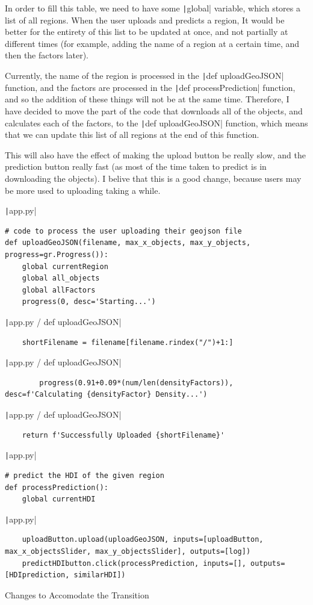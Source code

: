 \documentclass[12pt]{report}
\newcommand{\pil}[1]{\protect\texttt|#1|}
\begin{document}
In order to fill this table, we need to have some \pil{global} variable, which stores a list of all regions. When the user uploads and predicts a region, It would be better for the entirety of this list to be updated at once, and not partially at different times (for example, adding the name of a region at a certain time, and then the factors later).

Currently, the name of the region is processed in the \pil{def uploadGeoJSON} function, and the factors are processed in the \pil{def processPrediction} function, and so the addition of these things will not be at the same time. Therefore, I have decided to move the part of the code that downloads all of the objects, and calculates each of the factors, to the \pil{def uploadGeoJSON} function, which means that we can update this list of all regions at the end of this function.

This will also have the effect of making the upload button be really slow, and the prediction button really fast (as most of the time taken to predict is in downloading the objects). I belive that this is a good change, because users may be more used to uploading taking a while.

\begin{listing}[H]
\pil{app.py}
\begin{verbatim}
# code to process the user uploading their geojson file
def uploadGeoJSON(filename, max_x_objects, max_y_objects, progress=gr.Progress()):
    global currentRegion
    global all_objects
    global allFactors
    progress(0, desc='Starting...')
\end{verbatim}
\pil{app.py / def uploadGeoJSON}
\begin{verbatim}
    shortFilename = filename[filename.rindex("/")+1:]
\end{verbatim}
\pil{app.py / def uploadGeoJSON}
\begin{verbatim}
        progress(0.91+0.09*(num/len(densityFactors)), desc=f'Calculating {densityFactor} Density...')
\end{verbatim}
\pil{app.py / def uploadGeoJSON}
\begin{verbatim}
    return f'Successfully Uploaded {shortFilename}'
\end{verbatim}
\pil{app.py}
\begin{verbatim}
# predict the HDI of the given region
def processPrediction():
    global currentHDI
\end{verbatim}
\pil{app.py}
\begin{verbatim}
    uploadButton.upload(uploadGeoJSON, inputs=[uploadButton, max_x_objectsSlider, max_y_objectsSlider], outputs=[log])
    predictHDIbutton.click(processPrediction, inputs=[], outputs=[HDIprediction, similarHDI])
\end{verbatim}
\caption{Changes to Accomodate the Transition}\label{cs:shiftCode}
\end{listing}
\end{document}
